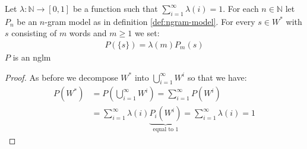 \documentclass[•]{book}
\begin{document}
\begin{theorem}\label{thm:higherOrderLM}
Let $\lambda:\mathbb{N}\longrightarrow [0,1]$ be a function such that $\sum_{i=1}^\infty\lambda(i) = 1$. 
For each $n\in\mathbb{N}$ let $P_n$ be an $n$-gram model as in definition \ref{def:ngram-model}. 
For every $s \in W^{*}$ with $s$ consisting of $m$ words and $m\geq 1$ we set:
\begin{align}
P(\{s\}) = \lambda(m)P_m({s})
\end{align}
$P$ is an \gls{nglm}
\begin{proof}
As before we decompose $W^{*}$ into $\bigcup_{i=1}^\infty W^{i}$ so that we have:
\begin{align}
P(W^{*}) & = P(\bigcup_{i=1}^\infty W^{i}) =\sum_{i=1}^\infty P(W^{i})  \\
& =  \sum_{i=1}^\infty \lambda(i)\underbrace{P_i(W^{i})}_{\text{equal to 1}} = \sum_{i=1}^\infty \lambda(i) = 1
\end{align} 
\end{proof}
\end{theorem}
\end{document}
